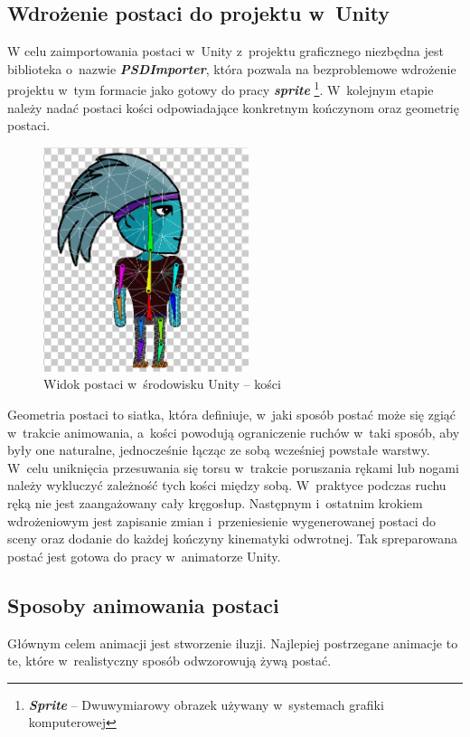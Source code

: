 \documentclass[oneside,polski,logo]{amuthesis}
\begin{document}
\subsection{Wdrożenie postaci do projektu w~Unity}
W celu zaimportowania postaci w~Unity z~projektu graficznego niezbędna jest biblioteka o~nazwie \textbf{\textit{PSDImporter}}, która pozwala na bezproblemowe wdrożenie projektu w~tym formacie jako gotowy do pracy \textbf{\textit{sprite}} \footnote{\textbf{\textit{Sprite}} – Dwuwymiarowy obrazek używany w~systemach grafiki komputerowej}. W~kolejnym etapie należy nadać postaci kości odpowiadające konkretnym kończynom oraz geometrię postaci.

\begin{figure}[h]
	\centering
	\includegraphics[width=6cm]{images/kozubal/bones.jpg}
	\caption{Widok postaci w~środowisku Unity – kości}
\end{figure}

Geometria postaci to siatka, która definiuje, w~jaki sposób postać może się zgiąć w~trakcie animowania, a~kości powodują ograniczenie ruchów w~taki sposób, aby były one naturalne, jednocześnie łącząc ze sobą wcześniej powstałe warstwy. W~celu uniknięcia przesuwania się torsu w~trakcie poruszania rękami lub nogami należy wykluczyć zależność tych kości między sobą. W~praktyce podczas ruchu ręką nie jest zaangażowany cały kręgosłup.
Następnym i~ostatnim krokiem wdrożeniowym jest zapisanie zmian i~przeniesienie wygenerowanej postaci do sceny oraz dodanie do każdej kończyny kinematyki odwrotnej. Tak spreparowana postać jest gotowa do pracy w~animatorze Unity.



\subsection{Sposoby animowania postaci}
Głównym celem animacji jest stworzenie iluzji. Najlepiej postrzegane animacje to te, które w~realistyczny sposób odwzorowują żywą postać.
\end{document}
